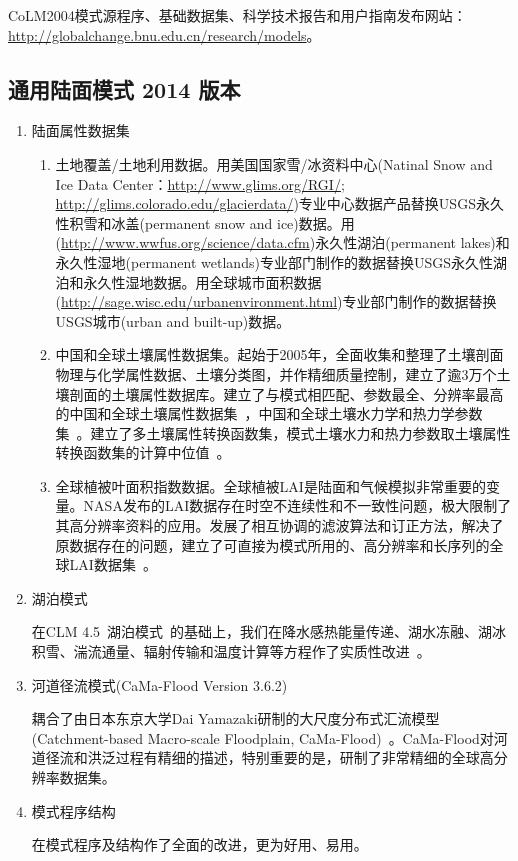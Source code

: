 CoLM2004模式源程序、基础数据集、科学技术报告和用户指南发布网站： \url{http://globalchange.bnu.edu.cn/research/models}。


\subsection{通用陆面模式 2014 版本}
\begin{enumerate}[label={\arabic*)}]
\item 陆面属性数据集
  \begin{enumerate}[label={\alph*)}]
  \item 土地覆盖/土地利用数据。用美国国家雪/冰资料中心(Natinal Snow and Ice Data Center：\url{http://www.glims.org/RGI/}; \url{http://glims.colorado.edu/glacierdata/})专业中心数据产品替换USGS永久性积雪和冰盖(permanent snow and ice)数据。用(\url{http://www.wwfus.org/science/data.cfm})永久性湖泊(permanent lakes)和永久性湿地(permanent wetlands)专业部门制作的数据替换USGS永久性湖泊和永久性湿地数据。用全球城市面积数据(\url{http://sage.wisc.edu/urbanenvironment.html})专业部门制作的数据替换USGS城市(urban and built-up)数据。
  \item 中国和全球土壤属性数据集。起始于2005年，全面收集和整理了土壤剖面物理与化学属性数据、土壤分类图，并作精细质量控制，建立了逾3万个土壤剖面的土壤属性数据库。建立了与模式相匹配、参数最全、分辨率最高的中国和全球土壤属性数据集~\citep{shangguan2013china,shangguan2014global}，中国和全球土壤水力学和热力学参数集~\citep{dai2013development}。建立了多土壤属性转换函数集，模式土壤水力和热力参数取土壤属性转换函数集的计算中位值~\citep{dai2013development}。
  \item 全球植被叶面积指数数据。全球植被LAI是陆面和气候模拟非常重要的变量。NASA发布的LAI数据存在时空不连续性和不一致性问题，极大限制了其高分辨率资料的应用。发展了相互协调的滤波算法和订正方法，解决了原数据存在的问题，建立了可直接为模式所用的、高分辨率和长序列的全球LAI数据集~\citep{yuan2011reprocessing}。
  \end{enumerate}

\item 湖泊模式

  在CLM 4.5~\citep{oleson2013technical}湖泊模式~\citep{subin2012improved}的基础上，我们在降水感热能量传递、湖水冻融、湖冰积雪、湍流通量、辐射传输和温度计算等方程作了实质性改进~\citep{戴永久2018通用陆面模式}。

\item 河道径流模式(CaMa-Flood Version 3.6.2)

  耦合了由日本东京大学Dai Yamazaki研制的大尺度分布式汇流模型  (Catchment-based Macro-scale Floodplain, CaMa-Flood)~\citep{yamazaki2011physically}。CaMa-Flood对河道径流和洪泛过程有精细的描述，特别重要的是，研制了非常精细的全球高分辨率数据集。

\item 模式程序结构

  在模式程序及结构作了全面的改进，更为好用、易用。
\end{enumerate}

